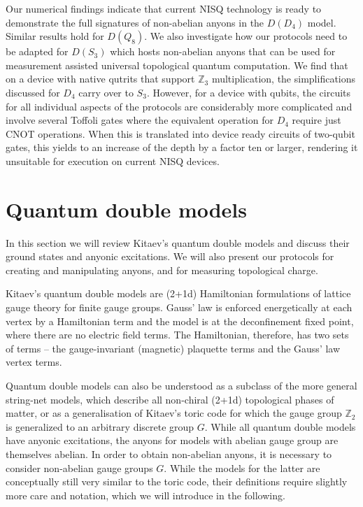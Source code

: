 \documentclass[two column]{article}
\begin{document}
Our numerical findings indicate that current NISQ technology is ready to demonstrate the full signatures of non-abelian anyons in the $D(D_4)$ model. Similar results hold for $D(Q_8)$. We also investigate how our protocols need to be adapted for $D(S_3)$ which hosts non-abelian anyons that can be used for measurement assisted universal topological quantum computation. We find that on a device with native qutrits that support $\mathbb Z_3$ multiplication, the simplifications discussed for $D_4$ carry over to $S_3$. However, for a device with qubits, the circuits for all individual aspects of the protocols are considerably more complicated and involve several Toffoli gates where the equivalent operation for $D_4$ require just CNOT operations. When this is translated into device ready circuits of two-qubit gates, this yields to an increase of the depth by a factor ten or larger, rendering it unsuitable for execution on current NISQ devices.


\section{Quantum double models}\label{sec:qm_double}

In this section we will review Kitaev's quantum double models\cite{Kitaev_2003} and discuss their ground states and anyonic excitations. We will also present our protocols for creating and manipulating anyons, and for measuring topological charge. 

Kitaev's quantum double models are (2+1d) Hamiltonian formulations of lattice gauge theory for finite gauge groups. Gauss' law is enforced energetically at each vertex by a Hamiltonian term and the model is at the deconfinement fixed point, where there are no electric field terms.
The Hamiltonian, therefore, has two sets of terms -- the gauge-invariant (magnetic) plaquette terms and the Gauss' law vertex terms\cite{cui2018topological, Kitaev_2003}. 

Quantum double models can also be understood as a subclass of the more general string-net models\cite{Levin_2005}, which describe all non-chiral (2+1d) topological phases of matter, or as a generalisation of Kitaev's toric code\cite{Kitaev_2003} for which the gauge group $\mathbb Z_2$ is generalized to an arbitrary discrete group $G$. While all quantum double models have anyonic excitations, the anyons for models with abelian gauge group are themselves abelian. In order to obtain non-abelian anyons, it is necessary to consider non-abelian gauge groups $G$. While the models for the latter are conceptually still very similar to the toric code, their definitions require slightly more care and notation, which we will introduce in the following. 
\end{document}
